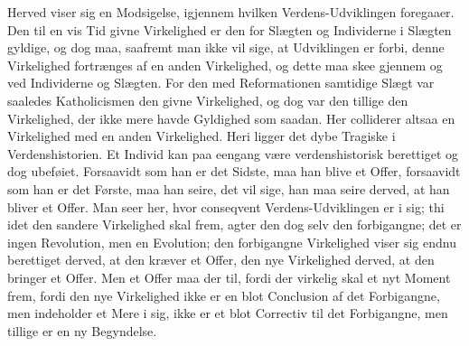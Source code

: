 \documentclass[12pt,a4paper]{article}
\begin{document}
Herved viser sig en Modsigelse, igjennem hvilken Verdens-Udviklingen foregaaer. Den til en vis Tid givne Virkelighed er den for Slægten og Individerne i Slægten gyldige, og dog maa, saafremt man ikke vil sige, at Udviklingen er forbi, denne Virkelighed fortrænges af en anden Virkelighed, og dette maa skee gjennem og ved Individerne og Slægten. For den med Reformationen samtidige Slægt var saaledes Katholicismen den givne Virkelighed, og dog var den tillige den Virkelighed, der ikke mere havde Gyldighed som saadan. Her colliderer altsaa en Virkelighed med en anden Virkelighed. Heri ligger det dybe Tragiske i Verdenshistorien. Et Individ kan paa eengang være verdenshistorisk berettiget og dog ubeføiet. Forsaavidt som han er det Sidste, maa han blive et Offer, forsaavidt som han er det Første, maa han seire, det vil sige, han maa seire derved, at han bliver et Offer. Man seer her, hvor conseqvent Verdens-Udviklingen er i sig; thi idet den sandere Virkelighed skal frem, agter den dog selv den forbigangne; det er ingen Revolution, men en Evolution; den forbigangne Virkelighed viser sig endnu berettiget derved, at den kræver et Offer, den nye Virkelighed derved, at den bringer et Offer. Men et Offer maa der til, fordi der virkelig skal et nyt Moment frem, fordi den nye Virkelighed ikke er en blot Conclusion af det Forbigangne, men indeholder et Mere i sig, ikke er et blot Correctiv til det Forbigangne, men tillige er en ny Begyndelse.
\end{document}
